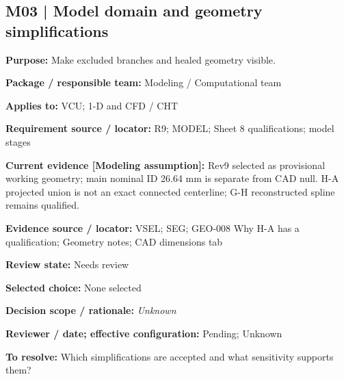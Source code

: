\documentclass[11pt]{article}
\begin{document}
\par\noindent\begin{minipage}{\textwidth}\small\setlength{\parskip}{2pt}
\subsection*{M03 | Model domain and geometry simplifications}
\textbf{Purpose:} Make excluded branches and healed geometry visible.\par
\textbf{Package / responsible team:} Modeling / Computational team\par
\textbf{Applies to:} VCU; 1-D and CFD / CHT\par
\textbf{Requirement source / locator:} R9; MODEL; Sheet 8 qualifications; model stages\par
\textbf{Current evidence [Modeling assumption]:} Rev9 selected as provisional working geometry; main nominal ID 26.64 mm is separate from CAD null. H-A projected union is not an exact connected centerline; G-H reconstructed spline remains qualified.\par
\textbf{Evidence source / locator:} VSEL; SEG; GEO-008 Why H-A has a qualification; Geometry notes; CAD dimensions tab\par
\textbf{Review state:} Needs review\par
\textbf{Selected choice:} None selected\par
\textbf{Decision scope / rationale:} \textit{Unknown}\par
\textbf{Reviewer / date; effective configuration:} Pending; Unknown\par
\textbf{To resolve:} Which simplifications are accepted and what sensitivity supports them?\par
\end{minipage}\par\vspace{5pt}
\end{document}
